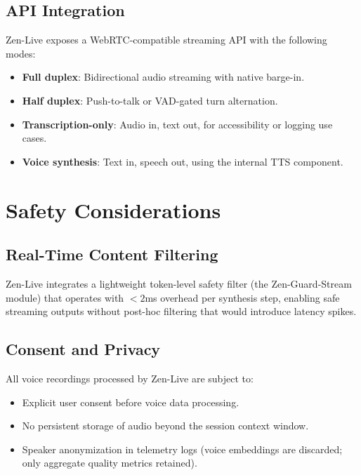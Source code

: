 \documentclass[11pt,a4paper]{article}
\begin{document}
\subsection{API Integration}

Zen-Live exposes a WebRTC-compatible streaming API with the following modes:

\begin{itemize}
  \item \textbf{Full duplex}: Bidirectional audio streaming with native barge-in.
  \item \textbf{Half duplex}: Push-to-talk or VAD-gated turn alternation.
  \item \textbf{Transcription-only}: Audio in, text out, for accessibility or logging use cases.
  \item \textbf{Voice synthesis}: Text in, speech out, using the internal TTS component.
\end{itemize}

\section{Safety Considerations}

\subsection{Real-Time Content Filtering}

Zen-Live integrates a lightweight token-level safety filter (the Zen-Guard-Stream module) that operates with $<2$ms overhead per synthesis step, enabling safe streaming outputs without post-hoc filtering that would introduce latency spikes.

\subsection{Consent and Privacy}

All voice recordings processed by Zen-Live are subject to:

\begin{itemize}
  \item Explicit user consent before voice data processing.
  \item No persistent storage of audio beyond the session context window.
  \item Speaker anonymization in telemetry logs (voice embeddings are discarded; only aggregate quality metrics retained).
\end{itemize}
\end{document}
